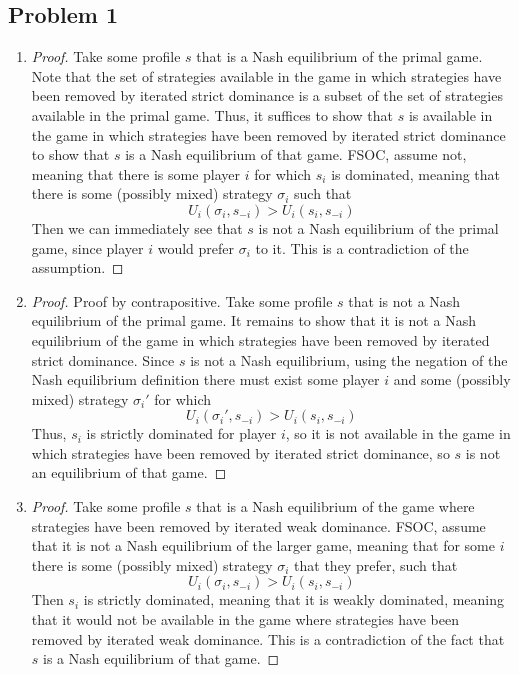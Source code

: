 \documentclass[10pt]{article}
\begin{document}
\maketitle

\subsection*{Problem 1}

\begin{enumerate}
	\item \begin{proof} Take some profile $s$ that is a Nash equilibrium of the primal game. Note that the set of strategies available in the game in which strategies have been removed by iterated strict dominance is a subset of the set of strategies available in the primal game. Thus, it suffices to show that $s$ is available in the game in which strategies have been removed by iterated strict dominance to show that $s$ is a Nash equilibrium of that game. FSOC, assume not, meaning that there is some player $i$ for which $s_i$ is dominated, meaning that there is some (possibly mixed) strategy $\sigma_i$ such that \[U_i(\sigma_i,s_{-i}) > U_i(s_i,s_{-i})\]Then we can immediately see that $s$ is not a Nash equilibrium of the primal game, since player $i$ would prefer $\sigma_i$ to it. This is a contradiction of the assumption. \end{proof}
	\item \begin{proof} Proof by contrapositive. Take some profile $s$ that is not a Nash equilibrium of the primal game. It remains to show that it is not a Nash equilibrium of the game in which strategies have been removed by iterated strict dominance. Since $s$ is not a Nash equilibrium, using the negation of the Nash equilibrium definition there must exist some player $i$ and some (possibly mixed) strategy $\sigma_i'$ for which \[U_i(\sigma_i',s_{-i}) > U_i(s_i,s_{-i})\]Thus, $s_i$ is strictly dominated for player $i$, so it is not available in the game in which strategies have been removed by iterated strict dominance, so $s$ is not an equilibrium of that game. \end{proof}
	\item \begin{proof} Take some profile $s$ that is a Nash equilibrium of the game where strategies have been removed by iterated weak dominance. FSOC, assume that it is not a Nash equilibrium of the larger game, meaning that for some $i$ there is some (possibly mixed) strategy $\sigma_i$ that they prefer, such that \[U_i(\sigma_i,s_{-i}) > U_i(s_i,s_{-i})\]Then $s_i$ is strictly dominated, meaning that it is weakly dominated, meaning that it would not be available in the game where strategies have been removed by iterated weak dominance. This is a contradiction of the fact that $s$ is a Nash equilibrium of that game. \end{proof} 

\end{enumerate}
\end{document}
